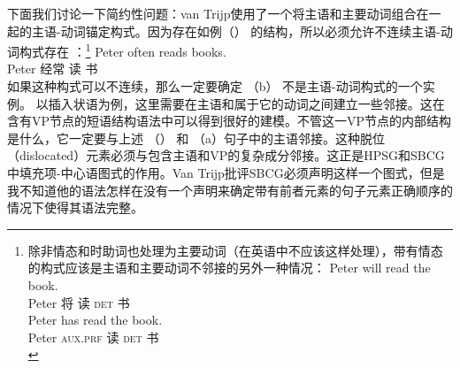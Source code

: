 下面我们讨论一下简约性问题：van Trijp使用了一个将主语和主要动词组合在一起的主语-动词锚定构式。因为存在如例（） 的结构，所以必须允许不连续主语-动词构式存在 ：\footnote{%
除非情态和时助词也处理为主要动词（在英语中不应该这样处理），带有情态的构式应该是主语和主要动词不邻接的另外一种情况：
  \eal
  \ex 
\gll Peter will read the book.\\
    Peter 将 读 \textsc{det} 书\\
  \ex 
\gll Peter has read the book.\\
    Peter \textsc{aux}.\textsc{prf} 读 \textsc{det} 书\\
  \zllast
} 
\ea
\gll Peter often reads books.\\
     Peter 经常 读 书\\
\z
如果这种构式可以不连续，那么一定要确定 （b） 不是主语-动词构式的一个实例。
\eal
{}
\zl
以插入状语为例，这里需要在主语和属于它的动词之间建立一些邻接。这在含有VP节点的短语结构语法中可以得到很好的建模。不管这一VP节点的内部结构是什么，它一定要与上述  （） 和 （a）句子中的主语邻接。这种脱位（dislocated）元素必须与包含主语和VP的复杂成分邻接。这正是HPSG和SBCG中填充项-中心语图式的作用。Van Trijp批评SBCG必须声明这样一个图式，但是我不知道他的语法怎样在没有一个声明来确定带有前者元素的句子元素正确顺序的情况下使得其语法完整。

